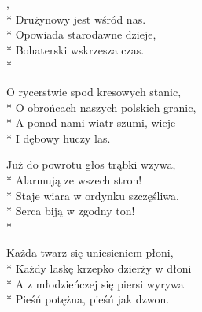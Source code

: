 \begin{lyrics}[longestline={\vin O obrońcach naszych polskich granic,}]

,\\*
Drużynowy jest wśród nas.\\*
Opowiada starodawne dzieje,\\*
Bohaterski wskrzesza czas.\\*
\medskip
\begin{markverses}
\vin O rycerstwie spod kresowych stanic,\\*
\vin O obrońcach naszych polskich granic,\\*
\vin A ponad nami wiatr szumi, wieje\\*
\vin I dębowy huczy las.
\end{markverses}

Już do powrotu głos trąbki wzywa,\\*
Alarmują ze wszech stron!\\*
Staje wiara w ordynku szczęśliwa,\\*
Serca biją w zgodny ton!\\*
\medskip
\begin{markverses}
\vin Każda twarz się uniesieniem płoni,\\*
\vin Każdy laskę krzepko dzierży w dłoni\\*
\vin A z młodzieńczej się piersi wyrywa\\*
\vin Pieśń potężna, pieśń jak dzwon.
\end{markverses}
\end{lyrics}




